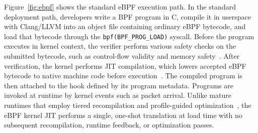 
Figure~\ref{fig:ebpf} shows the standard eBPF execution path. In the standard deployment path, developers write a BPF program in C, compile it in userspace with Clang/LLVM into an object file containing ordinary eBPF bytecode, and load that bytecode through the \texttt{bpf(BPF\_PROG\_LOAD)} syscall. Before the program executes in kernel context, the verifier perform various safety checks on the submitted bytecode, such as control-flow validity and memory safety~\cite{linuxkernel_bpf_verifier}. After verification, the kernel performs JIT compilation, which lowers accepted eBPF bytecode to native machine code before execution~\cite{ebpf_jit}. The compiled program is then attached to the hook defined by its program metadata. Programs are invoked at runtime by kernel events such as packet arrival. Unlike mature runtimes that employ tiered recompilation and profile-guided optimization~\cite{jvm_hotspot,v8_turbofan,llvm}, the eBPF kernel JIT performs a single, one-shot translation at load time with no subsequent recompilation, runtime feedback, or optimization passes.


